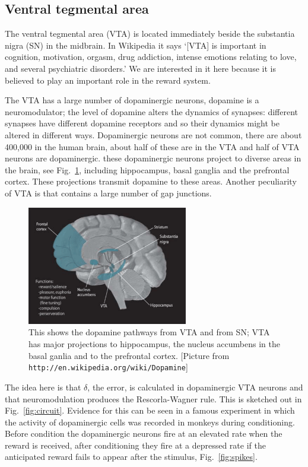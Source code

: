 \documentclass[11pt,a4paper]{scrartcl}
\begin{document}
\subsection*{Ventral tegmental area}

The ventral tegmental area (VTA) is located immediately beside the
substantia nigra (SN) in the midbrain. In Wikipedia it says \lq{}[VTA] is
important in cognition, motivation, orgasm, drug addiction, intense
emotions relating to love, and several psychiatric disorders.\rq{} We
are interested in it here because it is believed to play an important
role in the reward system. 

The VTA has a large number of dopaminergic neurons, dopamine is a
neuromodulator; the level of dopamine alters the dynamics of synapses:
different synapses have different dopamine receptors and so their
dynamics might be altered in different ways. Dopaminergic neurons are
not common, there are about 400,000 in the human brain, about half of
these are in the VTA and half of VTA neurons are dopaminergic. these
dopaminergic neurons project to diverse areas in the brain, see
Fig.~\ref{fig:VTA}, including hippocampus, basal ganglia and the
prefrontal cortex. These projections transmit dopamine to these
areas. Another peculiarity of VTA is that contains a large number of
gap junctions.

\begin{figure}
\begin{center}
\includegraphics[width=7cm]{Dopamine_Pathways.png}
\end{center}
\caption{This shows the dopamine pathways from VTA and from SN; VTA
  has major projections to hippocampus, the nucleus accumbens in the
  basal ganlia and to the prefrontal cortex. [Picture from
    \texttt{http://en.wikipedia.org/wiki/Dopamine}]\label{fig:VTA}}
\end{figure}

The idea here is that $\delta$, the error, is calculated in
dopaminergic VTA neurons and that neuromodulation produces the
Rescorla-Wagner rule. This is sketched out in
Fig.~\ref{fig:circuit}. Evidence for this can be seen in a famous
experiment \cite{SchultzDayanMontague1997a} in which the activity of
dopaminergic cells was recorded in monkeys during conditioning. Before
condition the dopaminergic neurons fire at an elevated rate when the
reward is received, after conditioning they fire at a depressed rate
if the anticipated reward fails to appear after the stimulus, Fig.~\ref{fig:spikes}.
\end{document}
